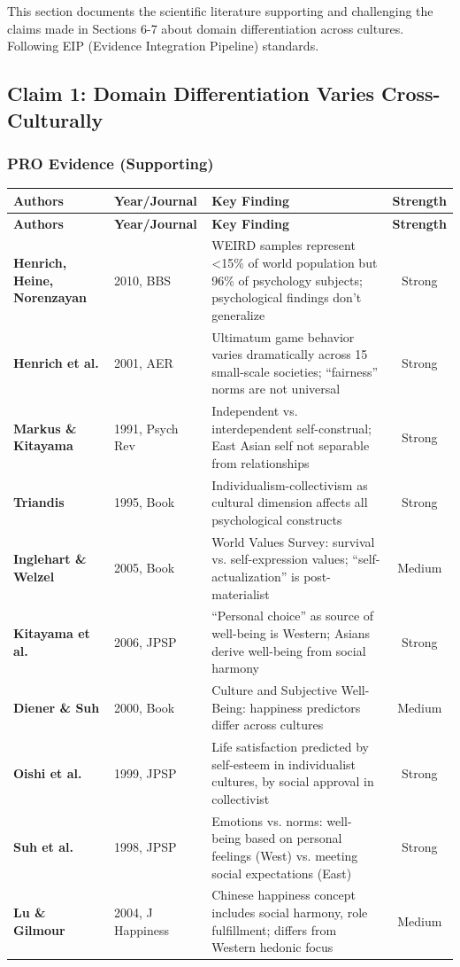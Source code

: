 This section documents the scientific literature supporting and challenging the claims made in Sections 6-7 about domain differentiation across cultures. Following EIP (Evidence Integration Pipeline) standards.

\subsection{Claim 1: Domain Differentiation Varies Cross-Culturally}

\subsubsection{PRO Evidence (Supporting)}

\begin{center}
\scriptsize
\begin{longtable}{@{}p{3cm}p{2cm}p{6cm}c@{}}
\toprule
\textbf{Authors} & \textbf{Year/Journal} & \textbf{Key Finding} & \textbf{Strength} \\
\midrule
\endfirsthead
\toprule
\textbf{Authors} & \textbf{Year/Journal} & \textbf{Key Finding} & \textbf{Strength} \\
\midrule
\endhead
\bottomrule
\endlastfoot
\textbf{Henrich, Heine, Norenzayan} & 2010, BBS & WEIRD samples represent <15\% of world population but 96\% of psychology subjects; psychological findings don't generalize & Strong \\
\textbf{Henrich et al.} & 2001, AER & Ultimatum game behavior varies dramatically across 15 small-scale societies; ``fairness'' norms are not universal & Strong \\
\textbf{Markus \& Kitayama} & 1991, Psych Rev & Independent vs. interdependent self-construal; East Asian self not separable from relationships & Strong \\
\textbf{Triandis} & 1995, Book & Individualism-collectivism as cultural dimension affects all psychological constructs & Strong \\
\textbf{Inglehart \& Welzel} & 2005, Book & World Values Survey: survival vs. self-expression values; ``self-actualization'' is post-materialist & Medium \\
\textbf{Kitayama et al.} & 2006, JPSP & ``Personal choice'' as source of well-being is Western; Asians derive well-being from social harmony & Strong \\
\textbf{Diener \& Suh} & 2000, Book & Culture and Subjective Well-Being: happiness predictors differ across cultures & Medium \\
\textbf{Oishi et al.} & 1999, JPSP & Life satisfaction predicted by self-esteem in individualist cultures, by social approval in collectivist & Strong \\
\textbf{Suh et al.} & 1998, JPSP & Emotions vs. norms: well-being based on personal feelings (West) vs. meeting social expectations (East) & Strong \\
\textbf{Lu \& Gilmour} & 2004, J Happiness & Chinese happiness concept includes social harmony, role fulfillment; differs from Western hedonic focus & Medium \\
\end{longtable}
\end{center}

